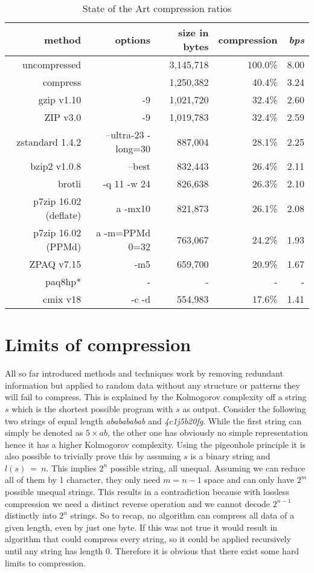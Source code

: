 {	\begin{table}[h]
		\begin{tabular}{r|r|r|r|r}
			method & options &  size in bytes & compression & \textit{bps}\\
			\hline
			uncompressed & & 3,145,718 & 100.0\% & 8.00 \\
			compress & & 1,250,382 & 40.4\% & 3.24 \\
			gzip v1.10 & -9 & 1,021,720 & 32.4\% & 2.60\\
			ZIP v3.0 &-9& 1,019,783 & 32.4\% & 2.59 \\
			zstandard 1.4.2& --ultra-23 -long=30 & 887,004 & 28.1\% & 2.25\\
			bzip2 v1.0.8 & --best & 832,443 & 26.4\% & 2.11 \\
			brotli & -q 11 -w 24 & 826,638 & 26.3\%& 2.10\\
			p7zip 16.02 (deflate) & a -mx10 & 821,873 & 26.1\% & 2.08 \\
			p7zip 16.02 (PPMd) & a -m=PPMd 0=32 & 763,067& 24.2\% & 1.93 \\
			ZPAQ v7.15 & -m5 & 659,700 & 20.9\% & 1.67  \\
			paq8hp* & - & - & - & - \\
			cmix v18 & -c -d & 554,983 & 17.6\% & 1.41 		
		\end{tabular}
				\label{tab:t20 stat of the art}
			\caption{State of the Art compression ratios}
	\end{table}
}

\section{Limits of compression}
\label{ch:Principles of compression:sec:Limits of Conpression}
\par{
All so far introduced methods and techniques work by removing redundant information but applied to random data without any structure or patterns they will fail to compress. This is explained by the Kolmogorov complexity\cite{kolmogorov} off a string $s$ which is the shortest possible program with $s$ as output. Consider the following two strings of equal length \textit{ababababab} and \textit{4c1j5b20fg}. While the first string can simply be denoted as $5 \times ab$, the other one has obviously no simple representation hence it has a higher Kolmogorov complexity. Using the pigeonhole principle it is also possible to trivially prove this by assuming $s$ is a binary string and $l(s) \: = \: n$. This implies $2^n$ possible string, all unequal. Assuming we can reduce all of them by 1 character, they only need $m = n - 1$ space and can only have $2^m$ possible unequal strings. This results in a contradiction because with lossless compression we need a distinct reverse operation and we cannot decode $2^{n-1}$ distinctly into $2^n$ strings. So to recap, no algorithm can compress all data of a given length, even by just one byte. If this was not true it would result in algorithm that could compress every string, so it could be applied recursively until any string has length 0. Therefore it is obvious that there exist some hard limits to compression.
}
